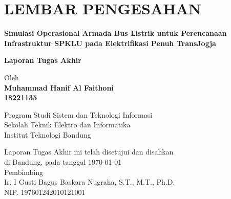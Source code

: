 \chapter*{LEMBAR PENGESAHAN}


\begin{center}
    \vspace{2cm}
  {\large\bfseries Simulasi Operasional Armada Bus Listrik untuk Perencanaan Infrastruktur SPKLU pada Elektrifikasi Penuh TransJogja}\\
     \vspace{2cm}

  {\Large \textbf{Laporan Tugas Akhir}}\\


  \vspace{1.5cm}
    
    
  {\large Oleh}\\[0.3cm]
    \textbf{
    {\large Muhammad Hanif Al Faithoni}\\
    {\large 18221135}
  }\\
    
  \vspace{0.5cm}
 
  {\large Program Studi Sistem dan Teknologi Informasi}\\
  {\large Sekolah Teknik Elektro dan Informatika}\\
  {\large Institut Teknologi Bandung}\\

  \vspace{1.5cm}

  Laporan Tugas Akhir ini telah disetujui dan disahkan\\ 
  di Bandung, pada tanggal \today\\[1cm]

	Pembimbing  \\[3cm]
	Ir. I Gusti Bagus Baskara Nugraha, S.T., M.T., Ph.D.\\[0.2cm]
	NIP. 197601242010121001

\end{center}

\vspace{1cm}
\noindent



